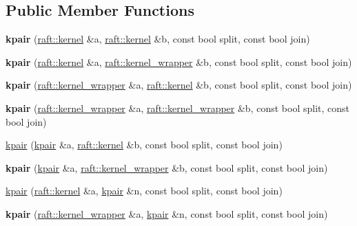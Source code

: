 \subsection*{Public Member Functions}
\begin{DoxyCompactItemize}
\item 
\hypertarget{classkpair_a4b81ebd439bd7602848efde889b86462}{}\label{classkpair_a4b81ebd439bd7602848efde889b86462} 
{\bfseries kpair} (\hyperlink{classraft_1_1kernel}{raft\+::kernel} \&a, \hyperlink{classraft_1_1kernel}{raft\+::kernel} \&b, const bool split, const bool join)
\item 
\hypertarget{classkpair_ac8cf2df761d326f1b47f24f1017ff55d}{}\label{classkpair_ac8cf2df761d326f1b47f24f1017ff55d} 
{\bfseries kpair} (\hyperlink{classraft_1_1kernel}{raft\+::kernel} \&a, \hyperlink{classraft_1_1kernel__wrapper}{raft\+::kernel\+\_\+wrapper} \&b, const bool split, const bool join)
\item 
\hypertarget{classkpair_a69bd39c9397c42e07a72c4879639452a}{}\label{classkpair_a69bd39c9397c42e07a72c4879639452a} 
{\bfseries kpair} (\hyperlink{classraft_1_1kernel__wrapper}{raft\+::kernel\+\_\+wrapper} \&a, \hyperlink{classraft_1_1kernel}{raft\+::kernel} \&b, const bool split, const bool join)
\item 
\hypertarget{classkpair_a311b7bfe1977b597fe2bbc07e22943b9}{}\label{classkpair_a311b7bfe1977b597fe2bbc07e22943b9} 
{\bfseries kpair} (\hyperlink{classraft_1_1kernel__wrapper}{raft\+::kernel\+\_\+wrapper} \&a, \hyperlink{classraft_1_1kernel__wrapper}{raft\+::kernel\+\_\+wrapper} \&b, const bool split, const bool join)
\item 
\hyperlink{classkpair_a5a1866af1277df07ee28df5e87a91b24}{kpair} (\hyperlink{classkpair}{kpair} \&a, \hyperlink{classraft_1_1kernel}{raft\+::kernel} \&b, const bool split, const bool join)
\item 
\hypertarget{classkpair_a54cd37c446e56ee43759fea401993a29}{}\label{classkpair_a54cd37c446e56ee43759fea401993a29} 
{\bfseries kpair} (\hyperlink{classkpair}{kpair} \&a, \hyperlink{classraft_1_1kernel__wrapper}{raft\+::kernel\+\_\+wrapper} \&b, const bool split, const bool join)
\item 
\hyperlink{classkpair_a05880ad7b01ca52580a80d30170c5f38}{kpair} (\hyperlink{classraft_1_1kernel}{raft\+::kernel} \&a, \hyperlink{classkpair}{kpair} \&n, const bool split, const bool join)
\item 
\hypertarget{classkpair_afe5b0e005935dcad04a780fe41258b18}{}\label{classkpair_afe5b0e005935dcad04a780fe41258b18} 
{\bfseries kpair} (\hyperlink{classraft_1_1kernel__wrapper}{raft\+::kernel\+\_\+wrapper} \&a, \hyperlink{classkpair}{kpair} \&n, const bool split, const bool join)

\end{DoxyCompactItemize}
